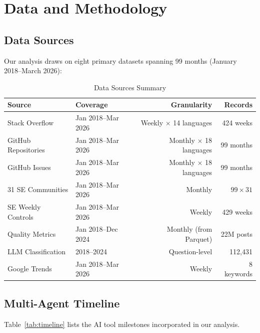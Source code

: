 \documentclass[11pt,a4paper]{article}
\begin{document}
\section{Data and Methodology}
\label{sec:method}

\subsection{Data Sources}

Our analysis draws on eight primary datasets spanning 99 months (January 2018--March 2026):

\begin{table}[h]
\centering
\caption{Data Sources Summary}
\begin{tabular}{llrr}
\toprule
\textbf{Source} & \textbf{Coverage} & \textbf{Granularity} & \textbf{Records} \\
\midrule
Stack Overflow & Jan 2018--Mar 2026 & Weekly $\times$ 14 languages & 424 weeks \\
GitHub Repositories & Jan 2018--Mar 2026 & Monthly $\times$ 18 languages & 99 months \\
GitHub Issues & Jan 2018--Mar 2026 & Monthly $\times$ 18 languages & 99 months \\
31 SE Communities & Jan 2018--Mar 2026 & Monthly & $99 \times 31$ \\
SE Weekly Controls & Jan 2018--Mar 2026 & Weekly & 429 weeks \\
Quality Metrics & Jan 2018--Dec 2024 & Monthly (from Parquet) & 22M posts \\
LLM Classification & 2018--2024 & Question-level & 112,431 \\
Google Trends & Jan 2018--Mar 2026 & Weekly & 8 keywords \\
\bottomrule
\end{tabular}
\end{table}

\subsection{Multi-Agent Timeline}

Table~\ref{tab:timeline} lists the AI tool milestones incorporated in our analysis.
\end{document}
